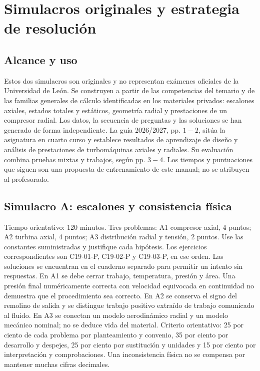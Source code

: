 \documentclass[10pt,openany]{book}
\begin{document}
\studiumchaptercheck

\chapter{Simulacros originales y estrategia de resolución}
\label{chap:c19}


\section{Alcance y uso}

Estos dos simulacros son originales y no representan exámenes oficiales de la Universidad de León. Se construyen a partir de las competencias del temario y de las familias generales de cálculo identificadas en los materiales privados: escalones axiales, estados totales y estáticos, geometría radial y prestaciones de un compresor radial. Los datos, la secuencia de preguntas y las soluciones se han generado de forma independiente.
La guía 2026/2027, pp. \(1-2\), sitúa la asignatura en cuarto curso y establece resultados de aprendizaje de diseño y análisis de prestaciones de turbomáquinas axiales y radiales. Su evaluación combina pruebas mixtas y trabajos, según pp. \(3-4\). Los tiempos y puntuaciones que siguen son una propuesta de entrenamiento de este manual; no se atribuyen al profesorado.

\section{Simulacro A: escalones y consistencia física}

Tiempo orientativo: 120 minutos. Tres problemas: A1 compresor axial, 4 puntos; A2 turbina axial, 4 puntos; A3 distribución radial y tensión, 2 puntos. Use las constantes suministradas y justifique cada hipótesis. Los ejercicios correspondientes son C19-01-P, C19-02-P y C19-03-P, en ese orden. Las soluciones se encuentran en el cuaderno separado para permitir un intento sin respuestas.
En A1 se debe cerrar trabajo, temperatura, presión y área. Una presión final numéricamente correcta con velocidad equivocada en continuidad no demuestra que el procedimiento sea correcto. En A2 se conserva el signo del remolino de salida y se distingue trabajo positivo extraído de trabajo comunicado al fluido. En A3 se conectan un modelo aerodinámico radial y un modelo mecánico nominal; no se deduce vida del material.
Criterio orientativo: 25 por ciento de cada problema por planteamiento y convenio, 35 por ciento por desarrollo y despejes, 25 por ciento por sustitución y unidades y 15 por ciento por interpretación y comprobaciones. Una inconsistencia física no se compensa por mantener muchas cifras decimales.
\end{document}

